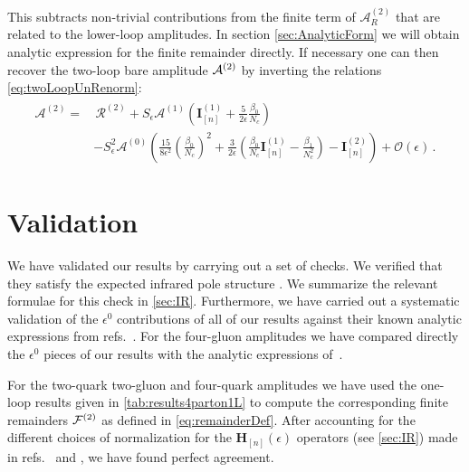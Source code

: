 This subtracts non-trivial contributions from
the finite term of $\mathcal{A}_R^{(2)}$ that are related to 
the lower-loop amplitudes.
In section \ref{sec:AnalyticForm} we will obtain analytic expression for the finite remainder directly.
If necessary one can then recover the two-loop bare amplitude $\mathcal{A}^{(2)}$ by inverting
the relations \eqref{eq:twoLoopUnRenorm}:
\begin{align}
  \begin{split}
    \label{eq:ampFromRem}
    {\mathcal{A}}^{(2)}=&\,\mathcal{R}^{(2)}+
    S_\epsilon{\mathcal{A}}^{(1)}
    \left(\mathbf{I}_{[n]}^{(1)}+\frac{5}{2\epsilon}
    \frac{\beta_0}
    {N_c}\right)\\
    &-S_\epsilon^2 {\mathcal{A}}^{(0)}
    \left(
    \frac{15}{8\epsilon^2}
    \left(\frac{\beta_0}{N_c}\right)^2+\frac{3}{2\epsilon}
    \left(\frac{\beta_0}{N_c}\mathbf{I}_{[n]}^{(1)}-
    \frac{\beta_1}{N_c^2}\right)-\mathbf{I}_{[n]}^{(2)}
    \right)+\mathcal{O}(\epsilon)\,.
  \end{split}
\end{align}



\section{Validation}
\label{sec:Validation-5parton}


We have validated our results by carrying out a set of
checks. We verified that they satisfy the
expected infrared pole structure \cite{Catani:1998bh}. We summarize the
relevant formulae for this check in \cref{sec:IR}.
Furthermore, we have carried out a systematic
validation of the $\epsilon^0$ contributions of all of 
our results against their known analytic
expressions from refs.~\cite{Bern:2002tk,Bern:2003ck,
DeFreitas:2004kmi,Glover:2004si}. 
For the four-gluon amplitudes we have compared directly the
$\epsilon^0$ pieces of our results with the analytic expressions
of~\cite{Bern:2002tk}.

For the two-quark two-gluon and four-quark amplitudes we have used the one-loop results given in \cref{tab:results4parton1L}
to compute the corresponding finite remainders $\mathcal{F}^{(2)}$ as
defined in \cref{eq:remainderDef}. 
After accounting for the different choices of 
normalization for the $\mathbf{H}_{[n]}(\epsilon)$ operators 
(see \cref{sec:IR})
made in refs.~\cite{Bern:2003ck} and \cite{Glover:2004si},
we have found perfect agreement.

